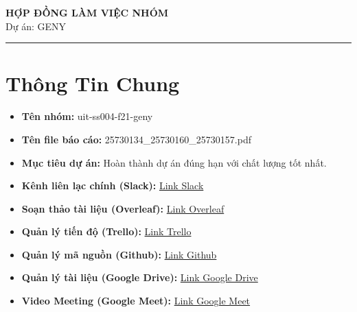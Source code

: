 \documentclass[12pt,a4paper]{article}
\begin{document}
\begin{center}
    {\LARGE \textbf{HỢP ĐỒNG LÀM VIỆC NHÓM}} \\[10pt]
    {\large Dự án: GENY}
\end{center}

\vspace{5pt} 
\hrule
\vspace{15pt} 

\section{Thông Tin Chung}
\begin{itemize}[label=--, itemsep=5pt]
    \item \textbf{Tên nhóm:} uit-ss004-f21-geny
    \item \textbf{Tên file báo cáo:} 25730134\_25730160\_25730157.pdf
    \item \textbf{Mục tiêu dự án:} Hoàn thành dự án đúng hạn với chất lượng tốt nhất.
    \item \textbf{Kênh liên lạc chính (Slack):} \href{https://ss004f21.slack.com/archives/C0ANP80FNSZ}{Link Slack}
    \item \textbf{Soạn thảo tài liệu (Overleaf):} \href{https://www.overleaf.com/read/phtyfmppvghp#c30e2d}{Link Overleaf}
    \item \textbf{Quản lý tiến độ (Trello):} \href{https://trello.com/b/GkDyf06n/geny}{Link Trello}
    \item \textbf{Quản lý mã nguồn (Github):} \href{https://github.com/phuctanpham/geny}{Link Github}
    \item \textbf{Quản lý tài liệu (Google Drive):} \href{https://drive.google.com/drive/folders/1IEzBxhfb_4P6zgbntiNNtDTZ6AZwMpZC?usp=sharing}{Link Google Drive}
    \item \textbf{Video Meeting (Google Meet):} \href{https://meet.google.com/owo-iige-rum}{Link Google Meet}
\end{itemize}
\end{document}
